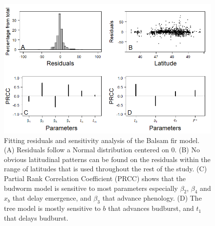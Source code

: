 \documentclass[12 pt]{article}
\begin{document}
\begin{figure}
    \centering
    \includegraphics[width = 17 cm, keepaspectratio]{Sensitivity}
    \caption{Fitting residuals and sensitivity analysis of the Balsam fir model. (A) Residuals follow a Normal distribution centered on $0$. (B) No obvious latitudinal patterns can be found on the residuals within the range of latitudes that is used throughout the rest of the study. (C) Partial Rank Correlation Coefficient (PRCC) shows that the budworm model is sensitive to most parameters especially $\beta _2$, $\beta _4$ and $x_b$ that delay emergence, and $\beta _3$ that advance phenology. (D) The tree model is mostly sensitive to $b$ that advances budburst, and $t_1$ that delays budburst.}
\end{figure}
\end{document}
